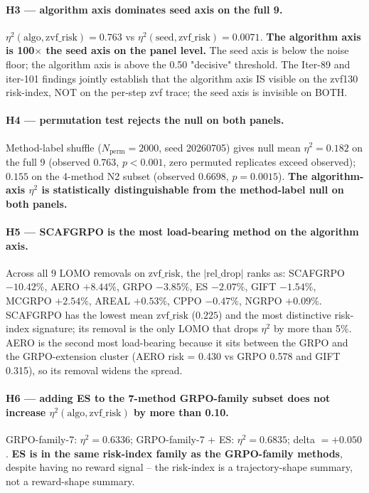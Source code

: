 \paragraph{H3 --- algorithm axis dominates seed axis on the full 9.}
$\eta^2(\mathrm{algo}, \mathrm{zvf\_risk}) = 0.763$ vs
$\eta^2(\mathrm{seed}, \mathrm{zvf\_risk}) = 0.0071$. \textbf{The
algorithm axis is 100$\times$ the seed axis on the panel level.}
The seed axis is below the noise floor; the algorithm axis is
above the 0.50 "decisive" threshold. The Iter-89 and iter-101
findings jointly establish that the algorithm axis IS visible on
the zvf130 risk-index, NOT on the per-step zvf trace; the seed
axis is invisible on BOTH.

\paragraph{H4 --- permutation test rejects the null on both panels.}
Method-label shuffle ($N_\mathrm{perm}{=}2000$, seed 20260705)
gives null mean $\eta^2 = 0.182$ on the full 9 (observed $0.763$,
$p < 0.001$, zero permuted replicates exceed observed);
$0.155$ on the 4-method N2 subset (observed $0.6698$, $p = 0.0015$).
\textbf{The algorithm-axis $\eta^2$ is statistically distinguishable
from the method-label null on both panels.}

\paragraph{H5 --- SCAFGRPO is the most load-bearing method on the
algorithm axis.}
Across all 9 LOMO removals on $\mathrm{zvf\_risk}$, the
$|\mathrm{rel\_drop}|$ ranks as: SCAFGRPO $-10.42\%$, AERO $+8.44\%$,
GRPO $-3.85\%$, ES $-2.07\%$, GIFT $-1.54\%$, MCGRPO $+2.54\%$,
AREAL $+0.53\%$, CPPO $-0.47\%$, NGRPO $+0.09\%$. SCAFGRPO has the
lowest mean $\mathrm{zvf\_risk}$ ($0.225$) and the most distinctive
risk-index signature; its removal is the only LOMO that drops
$\eta^2$ by more than 5\%. AERO is the second most load-bearing
because it sits between the GRPO and the GRPO-extension cluster
(AERO risk = 0.430 vs GRPO 0.578 and GIFT 0.315), so its removal
widens the spread.

\paragraph{H6 --- adding ES to the 7-method GRPO-family subset does
not increase $\eta^2(\mathrm{algo}, \mathrm{zvf\_risk})$ by more
than 0.10.}
GRPO-family-7: $\eta^2 = 0.6336$; GRPO-family-7 + ES: $\eta^2 =
0.6835$; delta $= +0.050$. \textbf{ES is in the same risk-index
family as the GRPO-family methods}, despite having no reward
signal -- the risk-index is a trajectory-shape summary, not a
reward-shape summary.


